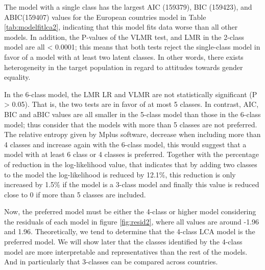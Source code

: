 \documentclass[12pt,a4paper,oneside]{reedthesis}
\begin{document}
The model with a single class has the largest AIC (159379), BIC (159423), and ABIC(159407) values for the European countries model in Table \ref{tab:modelfitlca2}, indicating that this model fits data worse than all other models. In addition, the P-values of the VLMR test, and LMR in the 2-class model are all \textless{} 0.0001; this means that both tests reject the single-class model in favor of a model with at least two latent classes. In other words, there exists heterogeneity in the target population in regard to attitudes towards gender equality.

In the 6-class model, the LMR LR and VLMR are not statistically significant (P \textgreater{} 0.05). That is, the two tests are in favor of at most 5 classes. In contrast, AIC, BIC and aBIC values are all smaller in the 5-class model than those in the 6-class model; thus consider that the models with more than 5 classes are not preferred. The relative entropy given by Mplus software, decrease when including more than 4 classes and increase again with the 6-class model, this would suggest that a model with at least 6 class or 4 classes is preferred. Together with the percentage of reduction in the log-likelihood value, that indicates that by adding two classes to the model the log-likelihood is reduced by 12.1\%, this reduction is only increased by 1.5\% if the model is a 3-class model and finally this value is reduced close to 0 if more than 5 classes are included.

Now, the preferred model must be either the 4-class or higher model considering the residuals of each model in figure \ref{fig:resid2}, where all values are around -1.96 and 1.96. Theoretically, we tend to determine that the 4-class LCA model is the preferred model. We will show later that the classes identified by the 4-class model are more interpretable and representatives than the rest of the models. And in particularly that 3-classes can be compared across countries.
\end{document}
